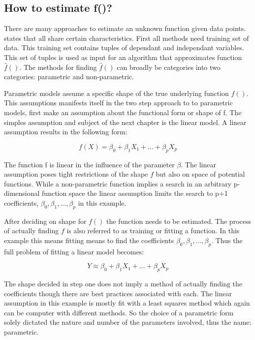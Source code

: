 \documentclass{article}
\begin{document}
     
    \subsection{How to estimate f()?}
    There are many approaches to estimate an unknown function given data points. \cite{hastie} states that all share certain characteristics. First all methods need training set of data. This training set contains tuples of dependant and independant variables. This set of tuples is used as input for an algorithm that approximates function $\widehat{f}()$. The methods for finding $\widehat{f}()$ can broadly be categories into two categories: parametric and non-parametric.
    
    Parametric models assume a specific shape of the true underlying function $f()$. This assumptions manifests itself in the two step approach to to parametric models, first make an assumption about the functional form or shape of f. The simples assumption and subject of the next chapter is the linear model. A linear assumption results in the following form:
    
    \begin{equation}
        f(X) = \beta_0 + \beta_1 X_1 + ... + \beta_p X_p
    \end{equation}
    
    The function f is linear in the influence of the parameter $\beta$. The linear assumption poses tight restrictions of the shape $f$ but also on space of potential functions. While a non-parametric function implies a search in an arbitrary p-dimensional function space the linear assumption limits the search to p+1 coefficients, $\beta_0,\beta_1, ... ,\beta_p$ in this example. 
    
    After deciding on shape for $f()$ the function needs to be estimated. The process of actually finding $f$ is also referred to as training or fitting a function. In this example this means fitting means to find the coefficients $\beta_0,\beta_1, ... ,\beta_p$. Thus the full problem of fitting a linear model becomes:
    
    \begin{equation}
        Y \approx \beta_0 + \beta_1 X_1 + ... + \beta_p X_p
    \end{equation}
    
    
    The shape decided in step one does not imply a method of actually finding the coefficients though there are best practices associated with each. The linear assumption in this example is mostly fit with a least squares method which again can be computer with different methods. So the choice of a parametric form solely dictated the nature and number of the parameters involved, thus the name: parametric.
    
\end{document}
